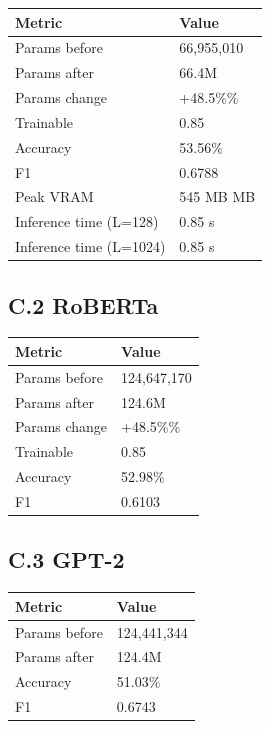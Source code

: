 \begin{table}[H]
\centering
\small
\begin{tabular}{ll}
\toprule
\textbf{Metric} & \textbf{Value} \\
\midrule
Params before & 66,955,010 \\
Params after & 66.4M \\
Params change & +48.5\%\% \\
Trainable & 0.85 \\
Accuracy & 53.56\% \\
F1 & 0.6788 \\
Peak VRAM & 545 MB MB \\
Inference time (L=128) & 0.85 s \\
Inference time (L=1024) & 0.85 s \\
\bottomrule
\end{tabular}
\end{table}

\subsection{C.2 RoBERTa}

\begin{table}[H]
\centering
\small
\begin{tabular}{ll}
\toprule
\textbf{Metric} & \textbf{Value} \\
\midrule
Params before & 124,647,170 \\
Params after & 124.6M \\
Params change & +48.5\%\% \\
Trainable & 0.85 \\
Accuracy & 52.98\% \\
F1 & 0.6103 \\
\bottomrule
\end{tabular}
\end{table}

\subsection{C.3 GPT-2}

\begin{table}[H]
\centering
\small
\begin{tabular}{ll}
\toprule
\textbf{Metric} & \textbf{Value} \\
\midrule
Params before & 124,441,344 \\
Params after & 124.4M \\
Accuracy & 51.03\% \\
F1 & 0.6743 \\
\bottomrule
\end{tabular}
\end{table}

